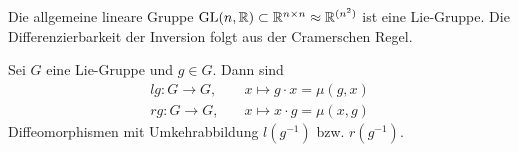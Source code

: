 \documentclass{cheat-sheet}
\begin{document}
\begin{bsp}
  Die allgemeine lineare Gruppe $\mathrm{GL}(n, \mathbb{R}) \subset \mathbb{R}^{n \times n} \approx \mathbb{R}^{(n^2)}$ ist eine Lie-Gruppe. Die Differenzierbarkeit der Inversion folgt aus der Cramerschen Regel.
\end{bsp}

\begin{defn}
  Sei $G$ eine Lie-Gruppe und $g \in G$. Dann sind
  \begin{align*}
    lg : G \to G, &\quad x \mapsto g \cdot x = \mu(g, x)\\
    rg : G \to G, &\quad x \mapsto x \cdot g = \mu(x, g)
  \end{align*}
  Diffeomorphismen mit Umkehrabbildung $l(g^{-1})$ bzw. $r(g^{-1})$.
\end{defn}

\end{document}
